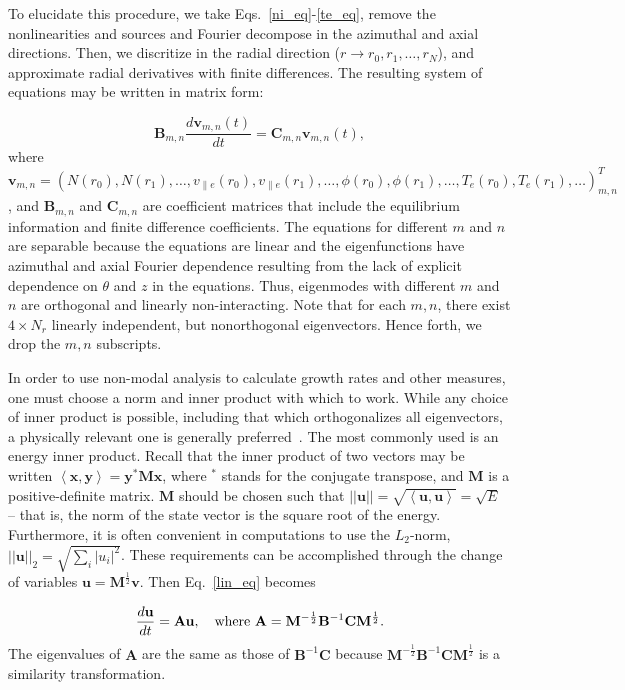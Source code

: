 \documentclass[showpacs,preprintnumbers,amsmath,amssymb,superscriptaddress,aip]{revtex4-1}
\def\beq{\begin{equation}}
\def\eeq{\end{equation}}
\newcommand{\diff}[2]{\frac{d#1}{d#2}}
\newcommand{\vpe}{v_{\parallel e}}
\begin{document}
To elucidate this procedure, we take Eqs.~\ref{ni_eq}-\ref{te_eq}, remove the nonlinearities and sources and Fourier decompose in the azimuthal and axial directions.
Then, we discritize in the radial direction ($r \rightarrow r_0, r_1, \ldots, r_N $), and approximate radial derivatives with finite differences. 
The resulting system of equations may be written in matrix form:

\beq
\label{lin_eq}
\mathbf{B}_{m,n} \diff{\mathbf{v}_{m,n}(t)}{t} = \mathbf{C}_{m,n} \mathbf{v}_{m,n}(t),
\eeq
where $\mathbf{v}_{m,n} = \left( N(r_0), N(r_1), \ldots, \vpe(r_0), \vpe(r_1), \ldots, \phi(r_0), \phi(r_1), \ldots, T_e(r_0), T_e(r_1), \ldots \right)_{m,n}^{T}$,
and $\mathbf{B}_{m,n}$ and $\mathbf{C}_{m,n}$ are coefficient matrices that include the equilibrium information and finite difference coefficients. 
The equations for different $m$ and $n$ are separable because the equations are linear and the eigenfunctions have azimuthal and axial Fourier dependence resulting from the lack of explicit
dependence on $\theta$ and $z$ in the equations. Thus, eigenmodes with different $m$ and $n$ are orthogonal and linearly non-interacting. Note that for each $m,n$, there exist $4 \times N_r$ linearly
independent, but nonorthogonal eigenvectors. Hence forth, we drop the $m,n$ subscripts.

In order to use non-modal analysis to calculate growth rates and other measures, one must choose a norm and inner product with which to work. While any choice of
inner product is possible, including that which orthogonalizes all eigenvectors, a physically relevant one is generally preferred~\cite{camargo1998,schmid2007,camporeale2010}. The most commonly used
is an energy inner product. Recall that the inner product of two vectors may be written $\left< \mathbf{x},\mathbf{y} \right> = \mathbf{y}^{*} \mathbf{M} \mathbf{x}$,
where $^*$ stands for the conjugate transpose, and $\mathbf{M}$ is a positive-definite matrix. $\mathbf{M}$ should be chosen such that 
$||\mathbf{u}|| = \sqrt{\left< \mathbf{u},\mathbf{u} \right>} = \sqrt{E}$ -- that is, the norm of the state vector is the square root of the energy. Furthermore, it is often convenient in
computations to use the $L_2$-norm, $||\mathbf{u}||_2 = \sqrt{\sum_i |u_i|^2}$. These requirements can be accomplished through the change of variables $\mathbf{u} = \mathbf{M}^{\frac{1}{2}} \mathbf{v}$.
Then Eq.~\ref{lin_eq} becomes

\beq
\label{lin_eq_A}
\diff{\mathbf{u}}{t} = \mathbf{A} \mathbf{u},  \quad \rm{where} \ \mathbf{A} = \mathbf{M}^{-\frac{1}{2}} \mathbf{B}^{-1} \mathbf{C} \mathbf{M}^{\frac{1}{2}}.
\eeq
The eigenvalues of $\mathbf{A}$ are the same as those of $\mathbf{B}^{-1} \mathbf{C}$ because $\mathbf{M}^{-\frac{1}{2}} \mathbf{B}^{-1} \mathbf{C} \mathbf{M}^{\frac{1}{2}}$ is a similarity transformation.
\end{document}
